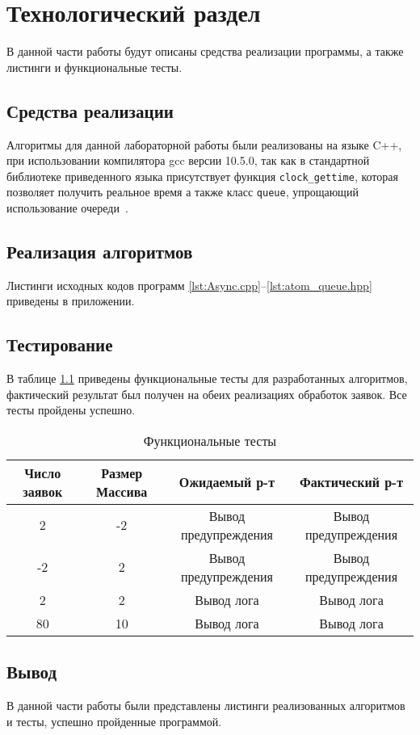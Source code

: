 \chapter{Технологический раздел}

В данной части работы будут описаны средства реализации программы, а также листинги и функциональные тесты.

\section{Средства реализации}
Алгоритмы для данной лабораторной работы были реализованы на языке C++, при использовании компилятора gcc версии 10.5.0, так как в стандартной библиотеке приведенного языка присутствует функция \texttt{clock\_gettime}, которая  позволяет получить реальное время а также класс \texttt{queue}, упрощающий использование очереди~\cite{cpp-time,queue}.



\section{Реализация алгоритмов}
Листинги исходных кодов программ  \ref{lst:Async.cpp}--\ref{lst:atom_queue.hpp} приведены в приложении.


\section{Тестирование}

В таблице \ref{t:tests} приведены функциональные тесты для разработанных алгоритмов, фактический результат был получен на обеих реализациях обработок заявок.
Все тесты пройдены успешно.
\begin{table}[ht]
	\small
	\begin{center}
			\caption{Функциональные тесты}
			\label{t:tests}
		\begin{tabular}{|c|c|c|c|}
			\hline
			Число заявок & Размер Массива & Ожидаемый р-т & Фактический р-т \\
			\hline
			2 & -2 & Вывод предупреждения & Вывод предупреждения \\ 	\hline
			-2 & 2 & Вывод предупреждения & Вывод предупреждения \\ \hline
			2 & 2 & Вывод лога & Вывод лога \\ \hline
			80 & 10 &  Вывод лога & Вывод лога \\ \hline
		\end{tabular}
	\end{center}
\end{table}

\section*{Вывод}
В данной части работы были представлены листинги реализованных алгоритмов и тесты, успешно пройденные программой.